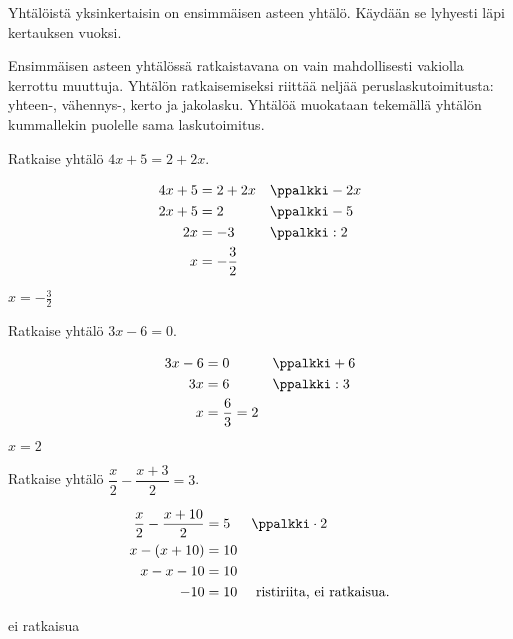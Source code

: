 Yhtälöistä yksinkertaisin on ensimmäisen asteen yhtälö. Käydään se lyhyesti läpi kertauksen vuoksi.

Ensimmäisen asteen yhtälössä ratkaistavana on vain mahdollisesti vakiolla kerrottu muuttuja. Yhtälön ratkaisemiseksi riittää neljää peruslaskutoimitusta: yhteen-, vähennys-, kerto ja jakolasku. Yhtälöä muokataan tekemällä yhtälön kummallekin puolelle sama laskutoimitus.



\begin{esimerkki}
Ratkaise yhtälö $4x + 5 = 2 + 2x$.

\begin{esimratk}
\begin{align*}
    4x + 5 &= 2 + 2x && \ppalkki -2x \\
    2x + 5 &= 2      && \ppalkki -5 \\
        2x &= -3     && \ppalkki :2 \\
         x &= -\frac{3}{2}
 \end{align*}
\end{esimratk}
\begin{esimvast}
$x=-\frac{3}{2}$
\end{esimvast}
\end{esimerkki}

\begin{esimerkki}
Ratkaise yhtälö $3x - 6 = 0$.

\begin{esimratk}
  \begin{align*}
    3x - 6 &= 0 && \ppalkki +6 \\
        3x &= 6 && \ppalkki :3 \\
         x &= \frac{6}{3}  = 2 \\
  \end{align*}
\end{esimratk}
\begin{esimvast}
$x=2$
\end{esimvast}
\end{esimerkki}

\begin{esimerkki}
Ratkaise yhtälö $\dfrac{x}{2}-\dfrac{x+3}{2}=3$.

\begin{esimratk}
  \begin{align*}
    \frac{x}{2}-\frac{x+10}{2}&=5 && \ppalkki \cdot 2 \\
        x-(x+10) &= 10  \\
         x-x-10 &= 10 \\
         -10 &= 10 && \text{ ristiriita, ei ratkaisua.}
  \end{align*}
\end{esimratk}
\begin{esimvast}
ei ratkaisua
\end{esimvast}
\end{esimerkki}

